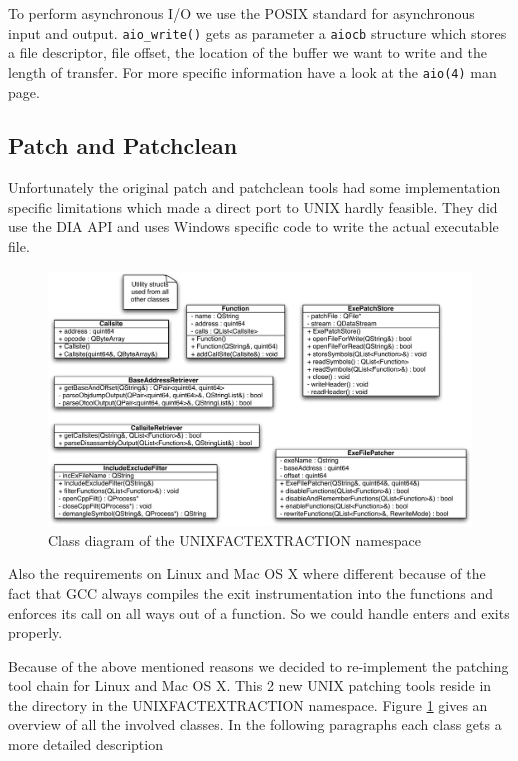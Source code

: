 To perform asynchronous I/O we use the POSIX standard for asynchronous input and output. \verb=aio_write()= gets as parameter a \verb=aiocb= structure which stores a file descriptor, file offset, the location of the buffer we want to write and the length of transfer. For more specific information have a look at the \verb=aio(4)= man page.


\subsection{Patch and Patchclean}

Unfortunately the original patch and patchclean tools had some implementation specific limitations which made a direct port to UNIX hardly feasible.  They did use the DIA API and  uses Windows specific code to write the actual executable file.

\begin{figure}[ht]
\centering
\includegraphics[width=16cm]{images/unixpatchtools}
\caption{Class diagram of the UNIXFACTEXTRACTION namespace} \label{fig:unixfe_unixfe}
\end{figure}

Also the requirements on Linux and Mac OS X where different because of the fact that GCC always compiles the exit instrumentation into the functions and enforces its call on all ways out of a function.  So we could handle enters and exits properly.

Because of the above mentioned reasons we decided to re-implement the patching tool chain for Linux and Mac OS X.  This 2 new UNIX patching tools reside in the  directory in the UNIXFACTEXTRACTION namespace.  Figure \ref{fig:unixfe_unixfe} gives an overview of all the involved classes.  In the following paragraphs each class gets a more detailed description

